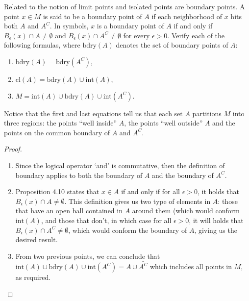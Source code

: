 \begin{exercise}{41}
Related to the notion of limit points and isolated points are boundary points. 
A point $x\in M$ is said to be a boundary point of $A$ if each neighborhood of $x$ hits both $A$ and $A^C$. 
In symbols, $x$ is a boundary point of $A$ if and only if $B_\epsilon(x)\cap A \neq\emptyset$ and $B_\epsilon(x)\cap A^C \neq\emptyset$ for every $\epsilon>0$. 
Verify each of the following formulas, where $\text{bdry}(A)$ denotes the set of boundary points of $A$:
\begin{enumerate}
    \item $\text{bdry}(A)=\text{bdry}(A^C)$,
    \item $\text{cl}(A)=\text{bdry}(A)\cup\text{int}(A)$,
    \item $M=\text{int}(A)\cup\text{bdry}(A)\cup\text{int}(A^C)$.
\end{enumerate}
Notice that the first and last equations tell us that each set $A$ partitions $M$ into three regions: 
the points ``well inside'' $A$, the points ``well outside'' $A$ and the points on the common boundary of $A$ and $A^C$.
\end{exercise}
\begin{proof}
\begin{enumerate}
    \item Since the logical operator `and' is commutative, then the definition of boundary applies to both the boundary of $A$ and the boundary of $A^C$.
    \item Proposition 4.10 states that $x\in\bar{A}$ if and only if for all $\epsilon>0$, it holds that $B_\epsilon(x)\cap A \neq\emptyset$.
    This definition gives us two type of elements in $A$:
    those that have an open ball contained in $A$ around them (which would conform $\text{int}(A)$,
    and those that don't, in which case for all $\epsilon>0$, it will holds that $B_\epsilon(x)\cap A^C \neq\emptyset$, which would conform the boundary of $A$, giving us the desired result.
    \item From two previous points, we can conclude that $\text{int}(A)\cup\text{bdry}(A)\cup\text{int}(A^C)=\bar{A}\cup \bar{A^C}$ which includes all points in $M$, as required.
\end{enumerate}
\end{proof} 

